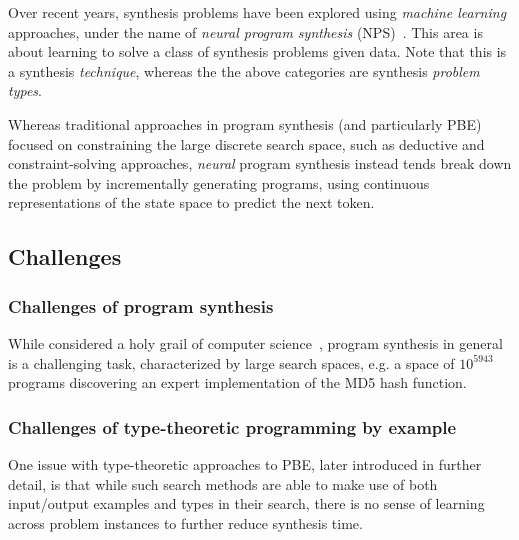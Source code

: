 \documentclass{article}
\begin{document}

Over recent years, synthesis problems have been explored using \emph{machine learning} approaches,
under the name of \emph{neural program synthesis} (NPS)~\citep{nps}.
This area is about learning to solve a class of synthesis problems given data.
Note that this is a synthesis \emph{technique}, whereas the the above categories are synthesis \emph{problem types}.

Whereas traditional approaches in program synthesis (and particularly PBE) focused on constraining the large discrete search space,
such as deductive and constraint-solving approaches,
\emph{neural} program synthesis instead tends break down the problem by incrementally generating programs,
using continuous representations of the state space to predict the next token.

\subsection{Challenges}

\subsubsection{Challenges of program synthesis}

While considered a holy grail of computer science~\citep{gulwani2017program},
program synthesis in general is a challenging task, characterized by large search spaces,
e.g. a space of $10^{5943}$ programs discovering an expert implementation of the MD5 hash function.~\cite{gulwani2017program}

\subsubsection{Challenges of type-theoretic programming by example} \label{sec:typepbe}

One issue with type-theoretic approaches to PBE, later introduced in further detail,
is that while such search methods are able to make use of both input/output examples and types in their search,
there is no sense of learning across problem instances to further reduce synthesis time.
\end{document}
